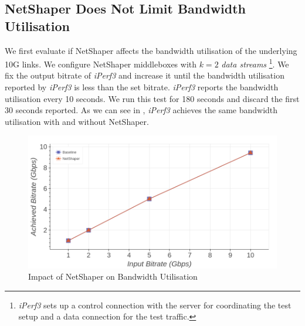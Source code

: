 \subsection{NetShaper Does Not Limit Bandwidth Utilisation}
\label{subsec:netshaper-evaluation-bw}

We first evaluate if NetShaper affects the bandwidth utilisation of the underlying 10G links.
We configure NetShaper middleboxes with $k = 2$ \textit{data streams}
\footnote{\textit{iPerf3} sets up a control connection with the server for coordinating the test setup and a data connection for the test traffic.}.
We fix the output bitrate of \textit{iPerf3} and increase it until the bandwidth utilisation reported by \textit{iPerf3} is less than the set bitrate.
\textit{iPerf3} reports the bandwidth utilisation every 10 seconds.
We run this test for 180 seconds and discard the first 30 seconds reported.
As we can see in , \textit{iPerf3} achieves the same bandwidth utilisation with and without NetShaper.

\begin{figure}[!htb]
    \centering
    \includegraphics[width=\columnwidth]{figures/netshaper/evaluation/bw.png}
    \caption{Impact of NetShaper on Bandwidth Utilisation}
    \label{fig:netshaper-eval-bw}
\end{figure}